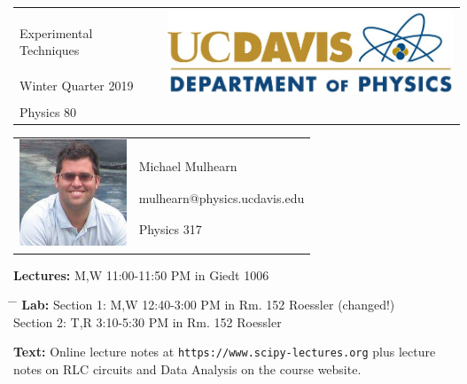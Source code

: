 \documentclass[12pt]{article}
\begin{document}
\begin{tabular*}{\textwidth}{l @{\extracolsep{\fill}} r}
  & \multirow{3}{*}{\includegraphics[height=1.0in]{logo.jpg}} \\
  \large Experimental Techniques & \\
  \large Winter Quarter 2019 & \\
  \large Physics 80 & \\
\end{tabular*}
\vspace{10mm}

\begin{tabular}{ l l }
  \multirow{6}{*}{\includegraphics[height=1.25in]{mike.jpg}} & \\
  & \\
  & \large Michael Mulhearn \\
  & \large mulhearn@physics.ucdavis.edu \\
  & \large Physics 317 \\
  & \\
\end{tabular}
\vskip 0.5cm
\noindent
\textbf {Lectures:} M,W 11:00-11:50 PM in Giedt 1006
\begin{tabbing}
\hspace*{3em}\= \hspace*{5em} \= \kill %
\textbf {Lab:}    \> Section 1: \> M,W 12:40-3:00 PM in Rm. 152 Roessler (changed!)\\
                  \> Section 2: \> T,R 3:10-5:30 PM in Rm. 152 Roessler \\
\end{tabbing}


\noindent
\textbf {Text:}  Online lecture notes at {\tt https://www.scipy-lectures.org} plus
lecture notes on RLC circuits and Data Analysis on the course website. \\
\end{document}
